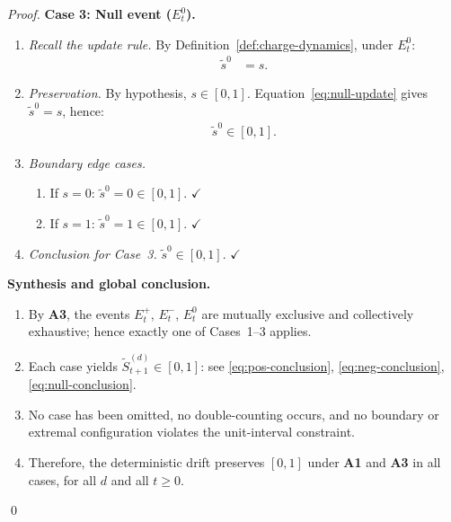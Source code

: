 \documentclass[12pt,openany]{book}
\numberwithin{equation}{chapter}
\theoremstyle{plain}
\theoremstyle{definition}
\theoremstyle{remark}
\def\mathcal#1{#1}%
\begin{document}
\begin{proof}
\medskip
\noindent\textbf{Case 3: Null event ($E_t^{0}$).}
\begin{enumerate}
  \item \emph{Recall the update rule.}
    By Definition~\ref{def:charge-dynamics}, under $E_t^{0}$:
    \begin{align}
      \tilde{s}^{0} &= s.
      \label{eq:null-update}
    \end{align}
  \item \emph{Preservation.}
    By hypothesis, $s \in [0,1]$.  Equation~\eqref{eq:null-update}
    gives $\tilde{s}^{0} = s$, hence:
    \begin{align}
      \tilde{s}^{0} \in [0,1].
      \label{eq:null-conclusion}
    \end{align}
  \item \emph{Boundary edge cases.}
    \begin{enumerate}
      \item If $s = 0$: $\tilde{s}^{0} = 0 \in [0,1]$.  $\checkmark$
      \item If $s = 1$: $\tilde{s}^{0} = 1 \in [0,1]$.  $\checkmark$
    \end{enumerate}
  \item \emph{Conclusion for Case~3.}
    $\tilde{s}^{0} \in [0,1]$.  $\checkmark$
\end{enumerate}

\medskip
\noindent\textbf{Synthesis and global conclusion.}
\begin{enumerate}
  \item By \textbf{A3}, the events $E_t^{+}$, $E_t^{-}$, $E_t^{0}$
    are mutually exclusive and collectively exhaustive; hence exactly
    one of Cases~1--3 applies.
  \item Each case yields
    $\tilde{\mathcal{S}}_{t+1}^{(d)} \in [0,1]$:
    see \eqref{eq:pos-conclusion}, \eqref{eq:neg-conclusion},
    \eqref{eq:null-conclusion}.
  \item No case has been omitted, no double-counting occurs, and no
    boundary or extremal configuration violates the unit-interval
    constraint.
  \item Therefore, the deterministic drift preserves $[0,1]$
    under \textbf{A1} and \textbf{A3} in all cases, for all $d$
    and all $t \geq 0$.
\end{enumerate}
\qed
\end{proof}
\end{document}
